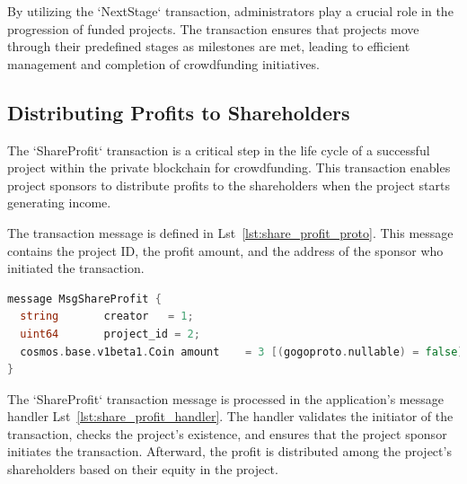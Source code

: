 By utilizing the `NextStage` transaction, administrators play a crucial role in the progression of funded projects. The transaction ensures that projects move through their predefined stages as milestones are met, leading to efficient management and completion of crowdfunding initiatives.

\subsection{Distributing Profits to Shareholders}

The `ShareProfit` transaction is a critical step in the life cycle of a successful project within the private blockchain for crowdfunding. This transaction enables project sponsors to distribute profits to the shareholders when the project starts generating income.

The transaction message is defined in Lst~\ref{lst:share_profit_proto}. This message contains the project ID, the profit amount, and the address of the sponsor who initiated the transaction.

\newpage
\begin{lstlisting}[language=go, caption=ShareProfit protobuf definition,label={lst:share_profit_proto}]
message MsgShareProfit {
  string       creator   = 1;
  uint64       project_id = 2;
  cosmos.base.v1beta1.Coin amount    = 3 [(gogoproto.nullable) = false];
}
\end{lstlisting}

The `ShareProfit` transaction message is processed in the application's message handler Lst~\ref{lst:share_profit_handler}. The handler validates the initiator of the transaction, checks the project's existence, and ensures that the project sponsor initiates the transaction. Afterward, the profit is distributed among the project's shareholders based on their equity in the project.

